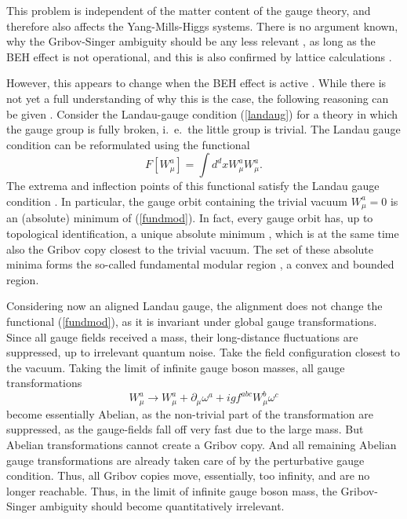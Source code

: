 \documentclass[final,12pt,3p,longtitle]{elsarticle}
\newcommand*{\no}{\noindent}
\newcommand*{\be}{\begin{equation}}
\newcommand*{\ee}{\end{equation}}
\newcommand*{\pd}{\partial}
\newcommand*{\pdm}{\pd_{\mu}}
\newcommand*{\pref}[1]{(\ref{#1})}
\newcommand*{\nn}{\nonumber}
\newcommand*{\1}{1\!\!\!\bot}
\begin{document}
This problem is independent of the matter content of the gauge theory, and therefore also affects the Yang-Mills-Higgs systems. There is no argument known, why the Gribov-Singer ambiguity should be any less relevant \cite{Lenz:1994tb,Lenz:2000zt,Maas:2011se,Maas:2010nc,Capri:2012ah,Capri:2012cr,Capri:2013oja,Capri:2013gha,Capri:2016gut,Greensite:2004ke}, as long as the BEH effect is not operational, and this is also confirmed by lattice calculations \cite{Maas:2010nc}.

However, this appears to change when the BEH effect is active \cite{Lenz:1994tb,Lenz:2000zt,Maas:2010nc,Ilderton:2010tf,Capri:2012ah,Capri:2012cr,Capri:2013oja,Capri:2013gha,Capri:2016gut,Greensite:2004ke}. While there is not yet a full understanding of why this is the case, the following reasoning can be given \cite{Lenz:2000zt}. Consider the Landau-gauge condition \pref{landaug} for a theory in which the gauge group is fully broken, i.\ e.\ the little group is trivial. The Landau gauge condition can be reformulated using the functional \cite{Maas:2011se,Zwanziger:1993dh}
\be
F[W_\mu^a]=\int d^dx W_\mu^a W_\mu^a\label{fundmod}.
\ee
\no The extrema and inflection points of this functional satisfy the Landau gauge condition \cite{Zwanziger:1993dh}. In particular, the gauge orbit containing the trivial vacuum $W_\mu^a=0$ is an (absolute) minimum of \pref{fundmod}. In fact, every gauge orbit has, up to topological identification, a unique absolute minimum \cite{Zwanziger:1993dh,vanBaal:1997gu,vanBaal:1991zw,Dell'Antonio:1991xt}, which is at the same time also the Gribov copy closest to the trivial vacuum. The set of these absolute minima forms the so-called fundamental modular region \cite{Zwanziger:1993dh,vanBaal:1991zw,Dell'Antonio:1991xt}, a convex and bounded region.

Considering now an aligned Landau gauge, the alignment does not change the functional \pref{fundmod}, as it is invariant under global gauge transformations. Since all gauge fields received a mass, their long-distance fluctuations are suppressed, up to irrelevant quantum noise. Take the field configuration closest to the vacuum. Taking the limit of infinite gauge boson masses, all gauge transformations
\be
W_\mu^a\to W^a_\mu+\pdm\omega^a+igf^{abc}W^b_\mu\omega^c\nn
\ee
\no become essentially Abelian, as the non-trivial part of the transformation are suppressed, as the gauge-fields fall off very fast due to the large mass. But Abelian transformations cannot create a Gribov copy. And all remaining Abelian gauge transformations are already taken care of by the perturbative gauge condition. Thus, all Gribov copies move, essentially, too infinity, and are no longer reachable. Thus, in the limit of infinite gauge boson mass, the Gribov-Singer ambiguity should become quantitatively irrelevant.
\end{document}
